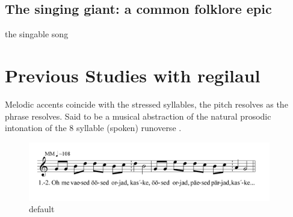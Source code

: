 %
%
%
%
%
%
%
%
%



%
\subsection{The singing giant: a common folklore epic} 
%
%
%
the singable song \cite{tormisKalevalaEstonianPerspective1985}
%
%
% 
 
 
 \cite{tormisProblemsThatRegilaul2007}






 
\section{Previous Studies with regilaul}



 
Melodic accents coincide with the stressed syllables, the pitch resolves as the phrase resolves. Said to be a musical abstraction of the natural prosodic intonation of the 8 syllable (spoken) runoverse \cite{ruutelResultsComputerizedComparative1999}.


\begin{figure}[htbp]
\begin{center}
\includegraphics[width=300pt]{figures/069.png}
\caption{default}
\label{default}
\end{center}
\end{figure}



